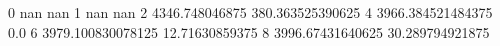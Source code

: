0 nan nan
1 nan nan
2 4346.748046875 380.363525390625
4 3966.384521484375 0.0
6 3979.100830078125 12.71630859375
8 3996.67431640625 30.289794921875
